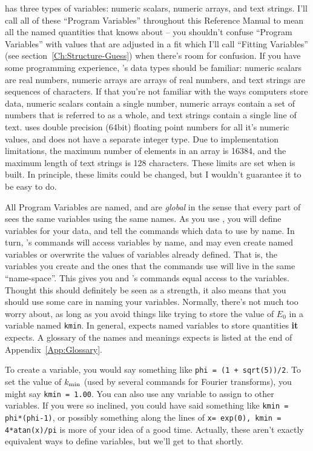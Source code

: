 {\ifeffit} has three types of variables: numeric scalars, numeric arrays,
and text strings.  I'll call all of these ``Program Variables'' throughout
this Reference Manual to mean all the named quantities that {\ifeffit}
knows about -- you shouldn't confuse ``Program Variables'' with values that
are adjusted in a fit which I'll call ``Fitting Variables'' (see
section~\ref{Ch:Structure-Guess}) when there's room for confusion.  If you
have some programming experience, {\ifeffit}'s data types should be
familiar: numeric scalars are real numbers, numeric arrays are arrays of
real numbers, and text strings are sequences of characters.  If that you're
not familiar with the ways computers store data, numeric scalars contain a
single number, numeric arrays contain a set of numbers that is referred to
as a whole, and text strings contain a single line of text.  {\ifeffit}
uses double precision (64bit) floating point numbers for all it's numeric
values, and does not have a separate integer type.  Due to implementation
limitations, the maximum number of elements in an array is 16384, and the
maximum length of text strings is 128 characters.  These limits are set
when {\ifeffit} is built.  In principle, these limits could be changed, but
I wouldn't guarantee it to be easy to do.

All Program Variables are named, and are {\emph{global}} in the sense that
every part of {\ifeffit} sees the same variables using the same names.  As
you use {\ifeffit}, you will define variables for your data, and tell the
commands which data to use by name.  In turn, {\ifeffit}'s commands will
access variables by name, and may even create named variables or overwrite
the values of variables already defined.  That is, the variables you create
and the ones that the {\ifeffit} commands use will live in the same
``name-space''.  This gives you and {\ifeffit}'s commands equal access to
the variables.  Thought this should definitely be seen as a strength, it
also means that you should use some care in naming your variables.
Normally, there's not much too worry about, as long as you avoid things
like trying to store the value of $E_0$ in a variable named {\tt{kmin}}.
In general, {\ifeffit} expects named variables to store quantities
{\bf{it}} expects.  A glossary of the names and meanings {\ifeffit} expects
is listed at the end of Appendix~\ref{App:Glossary}.

To create a variable, you would say something like {\tt{phi = (1 +
sqrt(5))/2}}.  To set the value of $k_{\rm min}$ (used by several
commands for Fourier transforms), you might say {\tt{kmin = 1.00}}.
You can also use any variable to assign to other variables.  If you
were so inclined, you could have said something like {\tt{kmin =
phi*(phi-1)}}, or possibly something along the lines of {\tt{x=
exp(0), kmin = 4*atan(x)/pi}} is more of your idea of a good time.
Actually, these aren't exactly equivalent ways to define variables,
but we'll get to that shortly.

